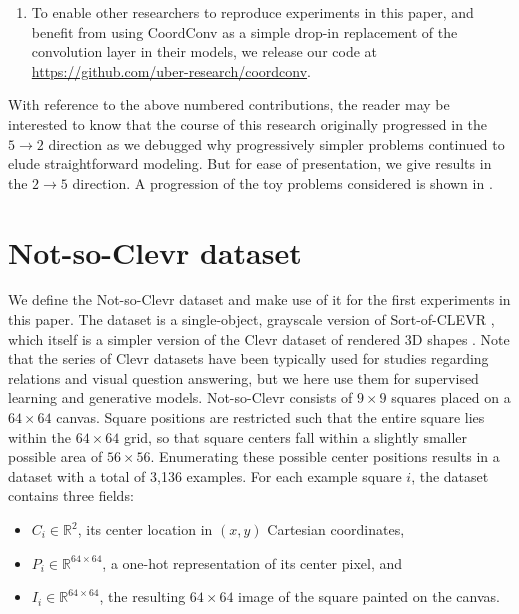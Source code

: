 \documentclass{article}
\begin{document}
\begin{enumerate}
\item
To enable other researchers to reproduce experiments in this paper, 
and benefit from using CoordConv as a simple drop-in replacement of the convolution layer in their models,
we release our code at \url{https://github.com/uber-research/coordconv}.

\end{enumerate}



With reference to the above numbered contributions, the reader may be interested to know that the course of this research originally progressed in the
$5 \rightarrow 2$ direction as we debugged why progressively simpler problems continued to elude straightforward modeling. But for ease of presentation, we give results in the $2 \rightarrow 5$ direction.
A progression of the toy problems considered is shown in .




















\section{Not-so-Clevr dataset}
\vspace*{-.6em}

We define the Not-so-Clevr dataset and make use of it for the first experiments in this paper. The dataset is a single-object, grayscale version of Sort-of-CLEVR \cite{sortofclevr}, which itself is a simpler version of the Clevr dataset of rendered 3D shapes \cite{clevr}.
Note that the series of Clevr datasets have been typically used for studies regarding relations and visual question answering, but we here use them for supervised learning and generative models.
Not-so-Clevr consists of $9\times9$ squares placed on a $64\times64$ canvas. Square positions are restricted such that the entire square lies within the $64\times64$ grid, so that square centers fall within a slightly smaller possible area of $56\times56$. Enumerating these possible center positions results in a dataset with a total of 3,136 examples.
For each example square $i$, the dataset contains three fields:

\vspace*{-.6em}
\begin{itemize}
\item $C_i \in \mathbb{R}^2$, its center location in $(x,y)$ Cartesian coordinates, \vspace*{-.2em}
\item $P_i \in \mathbb{R}^{64\times64}$, a one-hot representation of its center pixel, and \vspace*{-.2em}
\item $I_i \in \mathbb{R}^{64\times64}$, the resulting $64\times64$ image of the square painted on the canvas.
\end{itemize}
\vspace*{-.6em}
\end{document}
